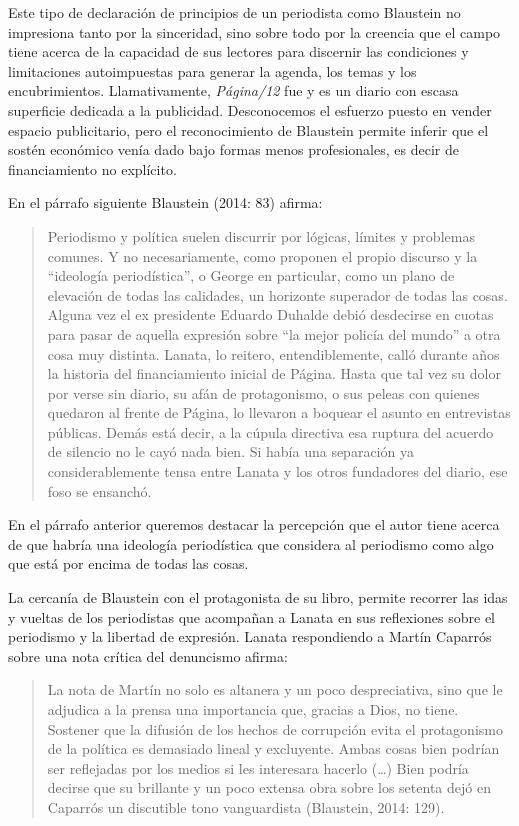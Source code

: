 Este tipo de declaración de principios de un periodista como Blaustein no impresiona tanto por la sinceridad, sino sobre todo por la creencia que el campo tiene acerca de la capacidad de sus lectores para discernir las condiciones y limitaciones autoimpuestas para generar la agenda, los temas y los encubrimientos. Llamativamente, \emph{Página/12} fue y es un diario con escasa superficie dedicada a la publicidad. Desconocemos el esfuerzo puesto en vender espacio publicitario, pero el reconocimiento de Blaustein permite inferir que el sostén económico venía dado bajo formas menos profesionales, es decir de financiamiento no explícito.

En el párrafo siguiente Blaustein (2014: 83) afirma:

\begin{quote}
Periodismo y política suelen discurrir por lógicas, límites y problemas comunes. Y no necesariamente, como proponen el propio discurso y la ``ideología periodística'', o George en particular, como un plano de elevación de todas las calidades, un horizonte superador de todas las cosas. Alguna vez el ex presidente Eduardo Duhalde debió desdecirse en cuotas para pasar de aquella expresión sobre ``la mejor policía del mundo'' a otra cosa muy distinta. Lanata, lo reitero, entendiblemente, calló durante años la historia del financiamiento inicial de Página. Hasta que tal vez su dolor por verse sin diario, su afán de protagonismo, o sus peleas con quienes quedaron al frente de Página, lo llevaron a boquear el asunto en entrevistas públicas. Demás está decir, a la cúpula directiva esa ruptura del acuerdo de silencio no le cayó nada bien. Si había una separación ya considerablemente tensa entre Lanata y los otros fundadores del diario, ese foso se ensanchó.
\end{quote}

En el párrafo anterior queremos destacar la percepción que el autor tiene acerca de que habría una ideología periodística que considera al periodismo como algo que está por encima de todas las cosas.

La cercanía de Blaustein con el protagonista de su libro, permite recorrer las idas y vueltas de los periodistas que acompañan a Lanata en sus reflexiones sobre el periodismo y la libertad de expresión. Lanata respondiendo a Martín Caparrós sobre una nota crítica del denuncismo afirma:

\begin{quote}
La nota de Martín no solo es altanera y un poco despreciativa, sino que le adjudica a la prensa una importancia que, gracias a Dios, no tiene. Sostener que la difusión de los hechos de corrupción evita el protagonismo de la política es demasiado lineal y excluyente. Ambas cosas bien podrían ser reflejadas por los medios si les interesara hacerlo (\ldots) Bien podría decirse que su brillante y un poco extensa obra sobre los setenta dejó en Caparrós un discutible tono vanguardista (Blaustein, 2014: 129).
\end{quote}

